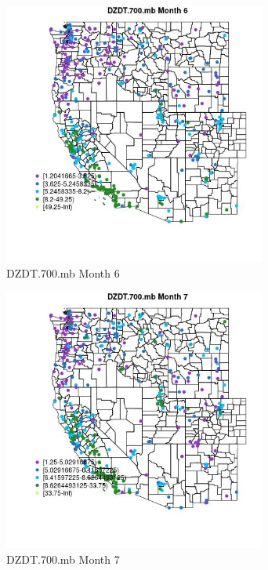 \clearpage 

\begin{figure} 
\centering  
\includegraphics[width=0.77\textwidth]{Code_Outputs/ML_input_report_ML_input_PM25_Step5_part_d_de_duplicated_aves_ML_input_MapObsMo6DZDT700mb.jpg} 
\caption{\label{fig:ML_input_report_ML_input_PM25_Step5_part_d_de_duplicated_aves_ML_inputMapObsMo6DZDT700mb}DZDT.700.mb Month 6} 
\end{figure} 
 

\begin{figure} 
\centering  
\includegraphics[width=0.77\textwidth]{Code_Outputs/ML_input_report_ML_input_PM25_Step5_part_d_de_duplicated_aves_ML_input_MapObsMo7DZDT700mb.jpg} 
\caption{\label{fig:ML_input_report_ML_input_PM25_Step5_part_d_de_duplicated_aves_ML_inputMapObsMo7DZDT700mb}DZDT.700.mb Month 7} 
\end{figure} 
 

